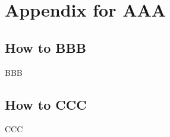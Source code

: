 \chapter{Appendix for AAA}
\minitoc

\section{How to BBB}\label{sec:apdx-BBB}
BBB

\section{How to CCC}\label{sec:apdx-CCC}
CCC
